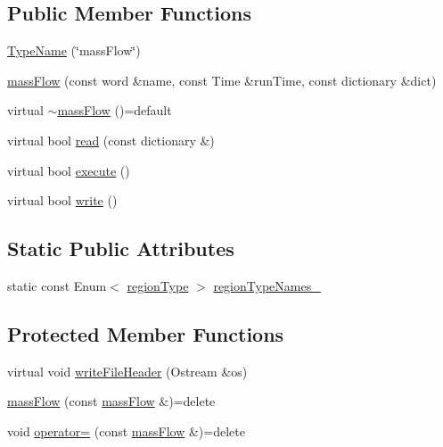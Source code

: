\subsection*{Public Member Functions}
\begin{DoxyCompactItemize}
\item 
\hyperlink{classFoam_1_1functionObjects_1_1massFlow_a3237b2177da80fc8020e331eefdf1543}{Type\+Name} (\char`\"{}mass\+Flow\char`\"{})
\item 
\hyperlink{classFoam_1_1functionObjects_1_1massFlow_aae80208b699303ea5d5dd8373039e883}{mass\+Flow} (const word \&name, const Time \&run\+Time, const dictionary \&dict)
\item 
virtual \hyperlink{classFoam_1_1functionObjects_1_1massFlow_a3dc6ff7f2940c82caa933e6621c1086e}{$\sim$mass\+Flow} ()=default
\item 
virtual bool \hyperlink{classFoam_1_1functionObjects_1_1massFlow_afac0600fef97b05534a595ce00b272ed}{read} (const dictionary \&)
\item 
virtual bool \hyperlink{classFoam_1_1functionObjects_1_1massFlow_ae006844a02161d12182ab372ca5c257b}{execute} ()
\item 
virtual bool \hyperlink{classFoam_1_1functionObjects_1_1massFlow_ae8f6374e29a250261b3979bbd6e5cb40}{write} ()
\end{DoxyCompactItemize}
\subsection*{Static Public Attributes}
\begin{DoxyCompactItemize}
\item 
static const Enum$<$ \hyperlink{classFoam_1_1functionObjects_1_1massFlow_a2c25b4a3d851e2d45d7a435a73598323}{region\+Type} $>$ \hyperlink{classFoam_1_1functionObjects_1_1massFlow_aac3daf62d3a91c8b8c62288c3c0a028f}{region\+Type\+Names\+\_\+}
\end{DoxyCompactItemize}
\subsection*{Protected Member Functions}
\begin{DoxyCompactItemize}
\item 
virtual void \hyperlink{classFoam_1_1functionObjects_1_1massFlow_ad0c7a238f021a605e38a115efbb20aa3}{write\+File\+Header} (Ostream \&os)
\item 
\hyperlink{classFoam_1_1functionObjects_1_1massFlow_a06491130d463e9cbc0d98cd4dc90ee72}{mass\+Flow} (const \hyperlink{classFoam_1_1functionObjects_1_1massFlow}{mass\+Flow} \&)=delete
\item 
void \hyperlink{classFoam_1_1functionObjects_1_1massFlow_ab5ab125e26c2d8f5dba5d2b3aa1ae266}{operator=} (const \hyperlink{classFoam_1_1functionObjects_1_1massFlow}{mass\+Flow} \&)=delete
\end{DoxyCompactItemize}
